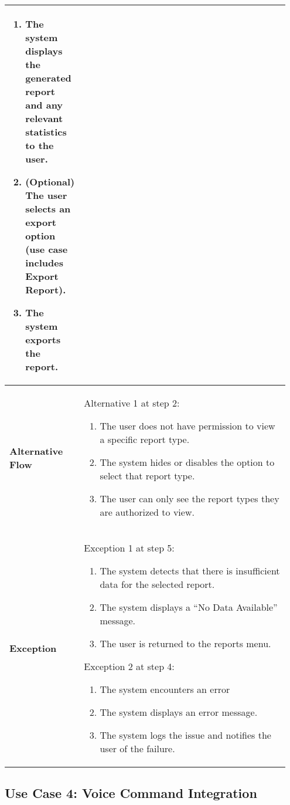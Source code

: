 \begin{longtable}{|>{\centering\arraybackslash}p{0.2\linewidth}|p{0.75\linewidth}|}
\begin{enumerate}[left=0pt,label=\arabic*.,nosep,topsep=0pt,itemsep=0pt,partopsep=0pt]
        \item The system displays the generated report and any relevant statistics to the user.
        \item (Optional) The user selects an export option (use case includes Export Report).
        \item The system exports the report.
    \end{enumerate} \\ \hline
    \textbf{Alternative Flow} & Alternative 1 at step 2:
    \begin{enumerate}[left=0pt,label=\arabic*.,nosep,topsep=0pt,itemsep=0pt,partopsep=0pt]
        \item The user does not have permission to view a specific report type.
        \item The system hides or disables the option to select that report type.
        \item The user can only see the report types they are authorized to view.
    \end{enumerate} \\ \hline
    \textbf{Exception} & Exception 1 at step 5:
    \begin{enumerate}[left=0pt,label=\arabic*.,nosep,topsep=0pt,itemsep=0pt,partopsep=0pt]
        \item The system detects that there is insufficient data for the selected report.
        \item The system displays a “No Data Available” message.
        \item The user is returned to the reports menu.
    \end{enumerate} 
    Exception 2 at step 4:
    \begin{enumerate}[left=0pt,label=\arabic*.,nosep,topsep=0pt,itemsep=0pt,partopsep=0pt]
        \item The system encounters an error
        \item The system displays an error message.
        \item The system logs the issue and notifies the user of the failure.
    \end{enumerate}
    \\ \hline
\end{longtable}

\newpage

\subsection{Use Case 4: Voice Command Integration}

